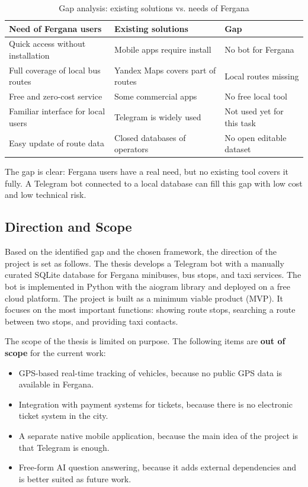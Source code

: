 \begin{table}[h]
\centering
\caption{Gap analysis: existing solutions vs. needs of Fergana}
\label{tab:gap}
\begin{tabular}{p{}p{}p{}}
\hline
\textbf{Need of Fergana users} & \textbf{Existing solutions} &
\textbf{Gap} \\
\hline
Quick access without
installation & Mobile apps require install & No bot for Fergana \\
Full coverage of local
bus routes & Yandex Maps covers part of routes & Local routes missing \\
Free and zero-cost service
& Some commercial apps & No free local tool \\
Familiar interface for
local users & Telegram is widely used & Not used yet for this task \\
Easy update of route data
& Closed databases of operators & No open editable dataset \\
\hline
\end{tabular}
\end{table}

The gap is clear: Fergana users have a real need, but no existing tool
covers it fully. A Telegram bot connected to a local database can fill
this gap with low cost and low technical risk.

\subsection{Direction and Scope}
\label{subsec:scope}

Based on the identified gap and the chosen framework, the direction of
the project is set as follows. The thesis develops a Telegram bot with a
manually curated SQLite database for Fergana minibuses, bus stops, and
taxi services. The bot is implemented in Python with the aiogram
library and deployed on a free cloud platform. The project is built as
a minimum viable product (MVP). It focuses on the most important
functions: showing route stops, searching a route between two stops,
and providing taxi contacts.

The scope of the thesis is limited on purpose. The following items are
\textbf{out of scope} for the current work:

\begin{itemize}
    \item GPS-based real-time tracking of vehicles, because no public
        GPS data is available in Fergana.
    \item Integration with payment systems for tickets, because there
        is no electronic ticket system in the city.
    \item A separate native mobile application, because the main idea
        of the project is that Telegram is enough.
    \item Free-form AI question answering, because it adds external
        dependencies and is better suited as future work.
\end{itemize}

